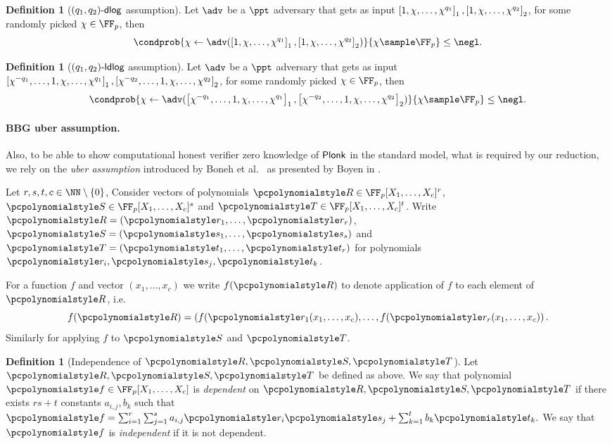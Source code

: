 \documentclass[runningheads,11pt]{llncs}
\theoremstyle{definition} \newtheorem{definition}[theorem]{Definition}
\begin{document}
\begin{definition}[$(q_1, q_2)\text{-}\mathsf{dlog}$ assumption]
	Let $\adv$ be a $\ppt$ adversary that gets as input $\left[1, \chi, \ldots, \chi^{q_1}\right]_{1}, \left[1, \chi, \ldots, \chi^{q_2}\right]_{2}$, for some randomly picked $\chi \in \FF_p$, then
	\[
		\condprob{\chi \gets \adv(\gone{1, \chi, \ldots, \chi^{q_1}}, \gtwo{1, \chi, \ldots, \chi^{q_2} })}{\chi \sample \FF_p} \leq \negl.
	\]
\end{definition}

\begin{definition}[$(q_1, q_2)\text{-}\mathsf{ldlog}$ assumption]
		Let $\adv$ be a $\ppt$ adversary that gets as input $\left[\chi^{-q_1},
		\ldots, 1, \chi, \ldots, \chi^{q_1}\right]_{1}, \left[\chi^{-q_2}, \ldots, 1, \chi, \ldots, \chi^{q_2}\right]_{2}$, for some randomly picked $\chi \in \FF_p$, then
	\[
			\condprob{\chi \gets \adv(\gone{\chi^{-q_1}, \ldots, 1, \chi, \ldots,
			\chi^{q_1}}, \gtwo{\chi^{-q_2}, \ldots, 1, \chi, \ldots, \chi^{q_2} })}{\chi \sample \FF_p} \leq \negl.
	\]
\end{definition}

\paragraph{BBG uber assumption.}
Also, to be able to show computational honest verifier zero knowledge of
$\textnormal{\textsf{Plonk}}$ in the standard model, what is required by our reduction, we rely on the
\emph{uber assumption} introduced by Boneh et
al.~\cite{EC:BonBoyGoh05} as presented by Boyen in \cite{PAIRING:Boyen08}.

Let $r, s, t, c \in \NN \setminus \smallset{0}$, Consider vectors of polynomials
$\pR \in \FF_p[X_1, \ldots, X_c]^r$, $\pS \in \FF_p[X_1, \ldots, X_c]^s$ and
$\pT \in \FF_p[X_1, \ldots, X_c]^t$. Write $\pR = \left( \p{r}_1, \ldots,
  \p{r}_r \right)$, $\pS = \left( \p{s}_1, \ldots, \p{s}_s \right)$ and $\pT =
\left( \p{t}_1, \ldots, \p{t}_r \right)$ for polynomials $\p{r}_i, \p{s}_j,
\p{t}_k$.

For a function $f$ and vector $(x_1, \ldots, x_c)$ we write $f(\pR)$ to
denote application of $f$ to each element of $\pR$, i.e.
\[
	f(\pR) = \left( f(\p{r}_1 (x_1, \ldots, x_c), \ldots, f(\p{r}_r
	(x_1, \ldots, x_c) \right).
\]
Similarly for applying $f$ to $\pS$ and $\pT$.

\begin{definition}[Independence of $\pR, \pS, \pT$]
	\label{def:independence}
	Let $\pR, \pS, \pT$ be defined as above. We say that polynomial $\p{f} \in
  \FF_p[X_1, \ldots, X_c]$ is \emph{dependent} on $\pR, \pS, \pT$ if there
  exists $rs + t$ constants $a_{i, j}, b_k$ such that $ \p{f} = \sum_{i = 1}^{r}
  \sum_{j = 1}^{s} a_{i, j} \p{r}_i \p{s}_j + \sum_{k = 1}^{t} b_k \p{t}_k. $ We
  say that $\p{f}$ is \emph{independent} if it is not dependent.
\end{definition}
\end{document}

